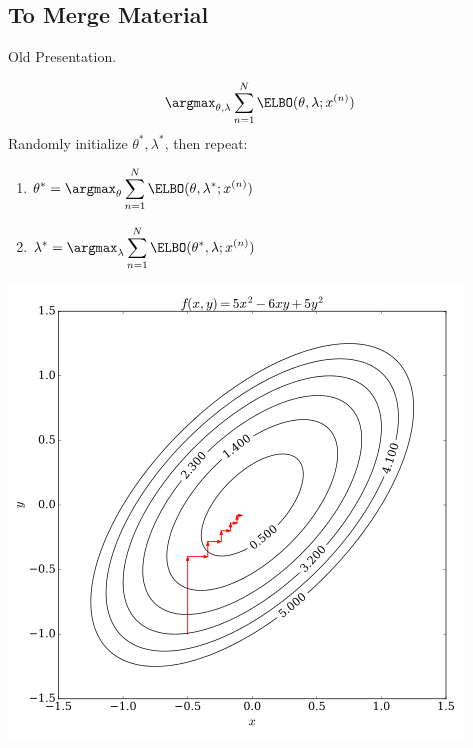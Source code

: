 \subsection{To Merge Material}
\begin{frame}
Old Presentation.
    
\end{frame}
\begin{frame}
\[ \argmax_{\theta, \lambda} \sum_{n=1}^N \ELBO(\theta, \lambda; x^{(n)}) \]
Randomly initialize $\theta^*, \lambda^*$, then repeat:
\begin{enumerate}
    \item $\displaystyle \theta^* = \argmax_\theta \sum_{n=1}^N \ELBO(\theta, \lambda^*; x^{(n)})$
    \item $\displaystyle \lambda^* = \argmax_\lambda \sum_{n=1}^N \ELBO(\theta^*, \lambda;x^{(n)})$
\end{enumerate}
\begin{center}
\includegraphics[scale=0.3]{pics/coordasc.png}
\end{center}

\end{frame}

